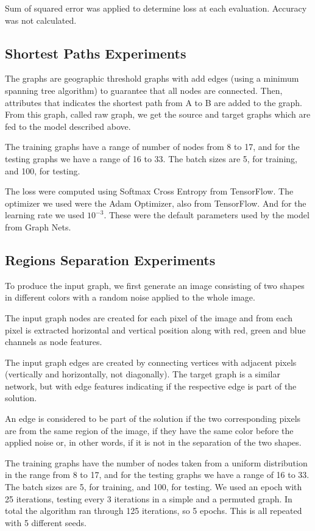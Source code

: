 Sum of squared error was applied to determine loss at each evaluation. Accuracy was not calculated.

\subsection{Shortest Paths Experiments}

The graphs are geographic threshold graphs with add edges (using a minimum spanning tree algorithm) to guarantee that all nodes are connected. Then, attributes that indicates the shortest path from A to B are added to the graph. From this graph, called raw graph, we get the source and target graphs which are fed to the model described above.

The training graphs have a range of number of nodes from 8 to 17, and for the testing graphs we have a range of 16 to 33. The batch sizes are 5, for training, and 100, for testing.

The loss were computed using Softmax Cross Entropy from TensorFlow. The optimizer we used were the Adam Optimizer, also from TensorFlow. And for the learning rate we used $10^{-3}$. These were the default parameters used by the model from Graph Nets.

\subsection{Regions Separation Experiments}

To produce the input graph, we first generate an image consisting of two shapes in different colors with a random noise applied to the whole image.

The input graph nodes are created for each pixel of the image and from each pixel is extracted horizontal and vertical position along with red, green and blue channels as node features.

The input graph edges are created by connecting vertices with adjacent pixels (vertically and horizontally, not diagonally).
The target graph is a similar network, but with edge features indicating if the respective edge is part of the solution.

An edge is considered to be part of the solution if the two corresponding pixels are from the same region of the image, if they have the same color before the applied noise or, in other words, if it is not in the separation of the two shapes.

The training graphs have the number of nodes taken from a uniform distribution in the range from 8 to 17, and for the testing graphs we have a range of 16 to 33. The batch sizes are 5, for training, and 100, for testing. We used an epoch with 25 iterations, testing every 3 iterations in a simple and a permuted graph. In total the algorithm ran through 125 iterations, so 5 epochs. This is all repeated with 5 different seeds.

